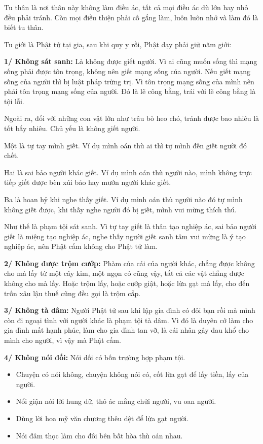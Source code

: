 \documentclass[
  12pt,
  oneside]{book}
\providecommand{\tightlist}{%
  \setlength{\itemsep}{0pt}\setlength{\parskip}{0pt}}
\begin{document}
Tu thân là nơi thân này không làm điều ác, tất cả mọi điều ác dù lớn hay nhỏ đều phải tránh. Còn mọi điều thiện phải cố gắng làm, luôn luôn nhớ và làm đó là biết tu thân.

Tu giới là Phật tử tại gia, sau khi quy y rồi, Phật dạy phải giữ năm giới:

\textbf{1/ Không sát sanh:} Là không được giết người. Vì ai cũng muốn sống thì mạng sống phải được tôn trọng, không nên giết mạng sống của người. Nếu giết mạng sống của người thì bị luật pháp trừng trị. Vì tôn trọng mạng sống của mình nên phải tôn trọng mạng sống của người. Đó là lẽ công bằng, trái với lẽ công bằng là tội lỗi.

Ngoài ra, đối với những con vật lớn như trâu bò heo chó, tránh được bao nhiêu là tốt bấy nhiêu. Chủ yếu là không giết người.

Một là tự tay mình giết. Ví dụ mình oán thù ai thì tự mình đến giết người đó chết.

Hai là sai bảo người khác giết. Ví dụ mình oán thù người nào, mình không trực tiếp giết được bèn xúi bảo hay mướn người khác giết.

Ba là hoan hỷ khi nghe thấy giết. Ví dụ mình oán thù người nào đó tự mình không giết được, khi thấy nghe người đó bị giết, mình vui mừng thích thú.

Như thế là phạm tội sát sanh. Vì tự tay giết là thân tạo nghiệp ác, sai bảo người giết là miệng tạo nghiệp ác, nghe thấy người giết sanh tâm vui mừng là ý tạo nghiệp ác, nên Phật cấm không cho Phật tử làm.

\textbf{2/ Không được trộm cướp:} Phàm của cải của người khác, chẳng được không cho mà lấy từ một cây kim, một ngọn cỏ cũng vậy, tất cả các vật chẳng được không cho mà lấy. Hoặc trộm lấy, hoặc cướp giật, hoặc lừa gạt mà lấy, cho đến trốn xâu lậu thuế cũng đều gọi là trộm cắp.

\textbf{3/ Không tà dâm:} Người Phật tử sau khi lập gia đình có đôi bạn rồi mà mình còn đi ngoại tình với người khác là phạm tội tà dâm. Vì đó là duyên cớ làm cho gia đình mất hạnh phúc, làm cho gia đình tan vỡ, là cái nhân gây đau khổ cho mình cho người, vì vậy mà Phật cấm.

\textbf{4/ Không nói dối:} Nói dối có bốn trường hợp phạm tội.

\begin{itemize}
\tightlist
\item
  Chuyện có nói không, chuyện không nói có, cốt lừa gạt để lấy tiền, lấy của người.\\
\item
  Nổi giận nói lời hung dữ, thô ác mắng chửi người, vu oan người.\\
\item
  Dùng lời hoa mỹ văn chương thêu dệt để lừa gạt người.\\
\item
  Nói đâm thọc làm cho đôi bên bất hòa thù oán nhau.
\end{itemize}
\end{document}

